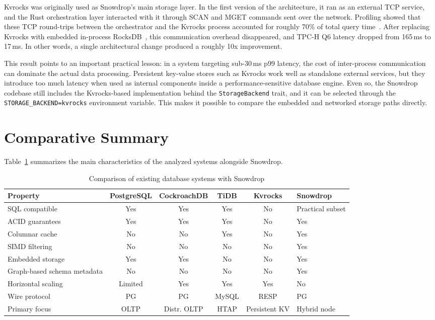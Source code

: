 Kvrocks was originally used as Snowdrop’s main storage layer. In the first version of the architecture, it ran as an external TCP service, and the Rust orchestration layer interacted with it through SCAN and MGET commands sent over the network. Profiling showed that these TCP round-trips between the orchestrator and the Kvrocks process accounted for roughly 70\% of total query time~\cite{luo2019}. After replacing Kvrocks with embedded in-process RocksDB~\cite{rocksdb2025}, this communication overhead disappeared, and TPC-H Q6 latency dropped from 165\,ms to 17\,ms. In other words, a single architectural change produced a roughly 10x improvement.

This result points to an important practical lesson: in a system targeting sub-30\,ms p99 latency, the cost of inter-process communication can dominate the actual data processing. Persistent key-value stores such as Kvrocks work well as standalone external services, but they introduce too much latency when used as internal components inside a performance-sensitive database engine. Even so, the Snowdrop codebase still includes the Kvrocks-based implementation behind the \texttt{StorageBackend} trait, and it can be selected through the \texttt{STORAGE\_BACKEND=kvrocks} environment variable. This makes it possible to compare the embedded and networked storage paths directly.

\section{Comparative Summary}

Table~\ref{tab:system-comparison} summarizes the main characteristics of the analyzed systems alongside Snowdrop.

\begin{table}[H]
\centering
\caption{Comparison of existing database systems with Snowdrop}
\label{tab:system-comparison}
\renewcommand{\arraystretch}{1.4}
\small
\begin{tabular}{|p{2.8cm}|c|c|c|c|p{2.2cm}|}
\hline
\textbf{Property} & \textbf{PostgreSQL} & \textbf{CockroachDB} & \textbf{TiDB} & \textbf{Kvrocks} & \textbf{Snowdrop} \\
\hline
SQL compatible      & Yes & Yes & Yes & No  & Practical subset \\
\hline
ACID guarantees     & Yes & Yes & Yes & No  & Yes \\
\hline
Columnar cache      & No  & No  & Yes & No  & Yes \\
\hline
SIMD filtering      & No  & No  & No  & No  & Yes \\
\hline
Embedded storage    & Yes & Yes & No  & No  & Yes \\
\hline
Graph-based schema metadata & No  & No  & No  & No  & Yes \\
\hline
Horizontal scaling  & Limited & Yes & Yes & Yes & No \\
\hline
Wire protocol       & PG  & PG  & MySQL & RESP & PG \\
\hline
Primary focus       & OLTP & Distr. OLTP & HTAP & Persistent KV & Hybrid node \\
\hline
\end{tabular}
\end{table}

